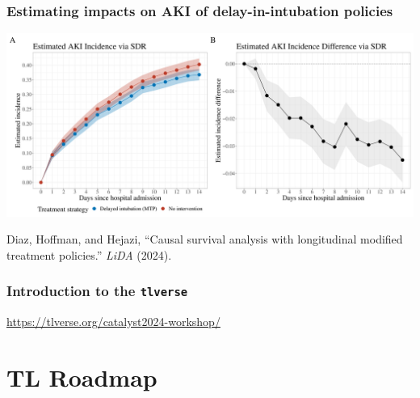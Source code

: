 \documentclass[t]{beamer}
\begin{document}
\begin{frame}
  \frametitle{Estimating impacts on AKI of delay-in-intubation policies}
  \vspace{-2em}
  \begin{center}
  \includegraphics[width=1.03\textwidth] {figures/hejazi_surv_lmtp.png}\hspace*{4cm}
  \end{center}
  \scriptsize{
  Diaz, Hoffman, and Hejazi, ``Causal survival analysis with longitudinal
  modified treatment policies.'' \textit{LiDA} (2024).}
\end{frame}


\begin{frame}
  \frametitle{Introduction to the \texttt{tlverse}}
  \url{https://tlverse.org/catalyst2024-workshop/}
\end{frame}

\section{TL Roadmap}
\end{document}
